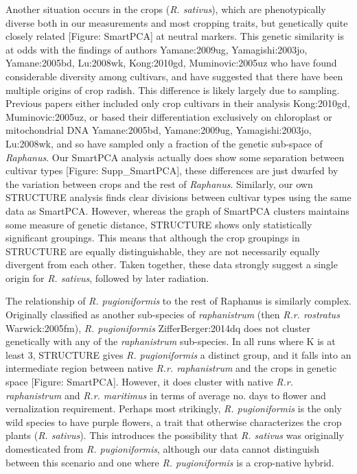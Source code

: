 \documentclass[twocolumn]{bmcart}%
\begin{document}
Another situation occurs in the crops (\textit{R. sativus}), which are phenotypically diverse both in our measurements and most cropping traits, but genetically quite closely related [Figure: SmartPCA] at neutral markers. This genetic similarity is at odds with the findings of authors {Yamane:2009ug, Yamagishi:2003jo, Yamane:2005bd, Lu:2008wk, Kong:2010gd, Muminovic:2005uz } who have found considerable diversity among cultivars, and have suggested that there have been multiple origins of crop radish. This difference is likely largely due to sampling. Previous papers either included only crop cultivars in their analysis {Kong:2010gd, Muminovic:2005uz}, or based their differentiation exclusively on chloroplast or mitochondrial DNA {Yamane:2005bd, Yamane:2009ug, Yamagishi:2003jo, Lu:2008wk}, and so have sampled only a fraction of the genetic sub-space of \textit{Raphanus}. Our SmartPCA analysis actually does show some separation between cultivar types [Figure: Supp\_SmartPCA], these differences are just dwarfed by the variation between crops and the rest of \textit{Raphanus}. Similarly, our own STRUCTURE analysis finds clear divisions between cultivar types using the same data as SmartPCA. However, whereas the graph of SmartPCA clusters maintains some measure of genetic distance, STRUCTURE shows only statistically significant groupings. This means that although the crop groupings in STRUCTURE are equally distinguishable, they are not necessarily equally divergent from each other. Taken together, these data strongly suggest a single origin for \textit{R. sativus}, followed by later radiation.

The relationship of \textit{R. pugioniformis} to the rest of Raphanus is similarly complex. Originally classified as another sub-species of \textit{raphanistrum} (then \textit{R.r. rostratus} {Warwick:2005fm}), \textit{R. pugioniformis} {ZifferBerger:2014dq} does not cluster genetically with any of the \textit{raphanistrum} sub-species. In all runs where K is at least 3, STRUCTURE gives \textit{R. pugioniformis} a distinct group, and it falls into an intermediate region between native \textit{R.r. raphanistrum} and the crops in genetic space [Figure: SmartPCA]. However, it does cluster with native \textit{R.r. raphanistrum} and \textit{R.r. maritimus} in terms of average no. days to flower and vernalization requirement. Perhaps most strikingly, \textit{R. pugioniformis} is the only wild species to have purple flowers, a trait that otherwise characterizes the crop plants (\textit{R. sativus}). This introduces the possibility that \textit{R. sativus} was originally domesticated from \textit{R. pugioniformis}, although our data cannot distinguish between this scenario and one where \textit{R. pugioniformis} is a crop-native hybrid.
\end{document}
